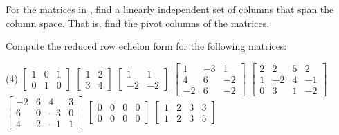 \begin{exercise}
For the matrices in , find
a linearly independent set of columns that span the column space.
That is, find the pivot columns of the matrices.
\end{exercise}

\setcounter{exercise}{100}

\begin{exercise}
Compute the reduced row echelon form for the following matrices:
\begin{tasks}(4)
\task
$\begin{bmatrix}
1 & 0 & 1 \\
0 & 1 & 0
\end{bmatrix}$
\task
$\begin{bmatrix}
1 & 2 \\
3 & 4
\end{bmatrix}$
\task
$\begin{bmatrix}
1 & 1 \\
-2 & -2
\end{bmatrix}$
\task
$\begin{bmatrix}
1 & -3 & 1 \\
4 & 6 & -2 \\
-2 & 6 & -2
\end{bmatrix}$
\task
$\begin{bmatrix}
2 & 2 & 5 & 2 \\
1 & -2 & 4 & -1 \\
0 & 3 & 1 & -2
\end{bmatrix}$
\task
$\begin{bmatrix}
-2 & 6 & 4 & 3 \\
6 & 0 & -3 & 0 \\
4 & 2 & -1 & 1
\end{bmatrix}$
\task
$\begin{bmatrix}
0 & 0 & 0 & 0 \\
0 & 0 & 0 & 0
\end{bmatrix}$
\task
$\begin{bmatrix}
1 & 2 & 3 & 3 \\
1 & 2 & 3 & 5
\end{bmatrix}$
\end{tasks}
\end{exercise}
